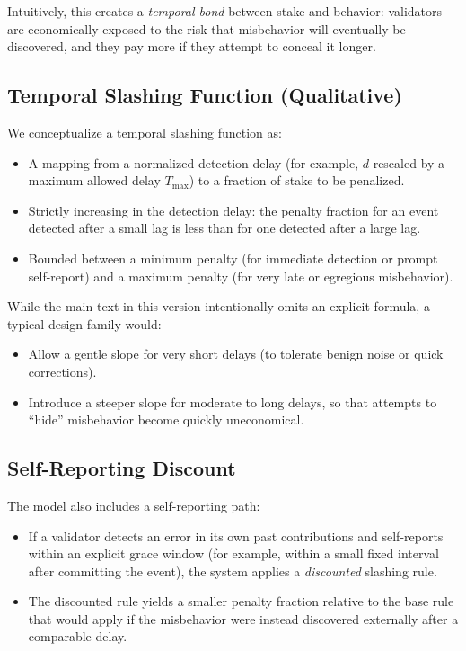\documentclass[11pt]{article}
\begin{document}
Intuitively, this creates a \emph{temporal bond} between stake and behavior: validators are economically exposed to the risk that misbehavior will eventually be discovered, and they pay more if they attempt to conceal it longer.

\subsection{Temporal Slashing Function (Qualitative)}

We conceptualize a temporal slashing function as:
\begin{itemize}[leftmargin=*]
  \item A mapping from a normalized detection delay (for example, \(d\) rescaled by a maximum allowed delay \(T_{\max}\)) to a fraction of stake to be penalized.
  \item Strictly increasing in the detection delay: the penalty fraction for an event detected after a small lag is less than for one detected after a large lag.
  \item Bounded between a minimum penalty (for immediate detection or prompt self-report) and a maximum penalty (for very late or egregious misbehavior).
\end{itemize}

While the main text in this version intentionally omits an explicit formula, a typical design family would:
\begin{itemize}[leftmargin=*]
  \item Allow a gentle slope for very short delays (to tolerate benign noise or quick corrections).
  \item Introduce a steeper slope for moderate to long delays, so that attempts to ``hide'' misbehavior become quickly uneconomical.
\end{itemize}

\subsection{Self-Reporting Discount}

The model also includes a self-reporting path:
\begin{itemize}[leftmargin=*]
  \item If a validator detects an error in its own past contributions and self-reports within an explicit grace window (for example, within a small fixed interval after committing the event), the system applies a \emph{discounted} slashing rule.
  \item The discounted rule yields a smaller penalty fraction relative to the base rule that would apply if the misbehavior were instead discovered externally after a comparable delay.
\end{itemize}
\end{document}
